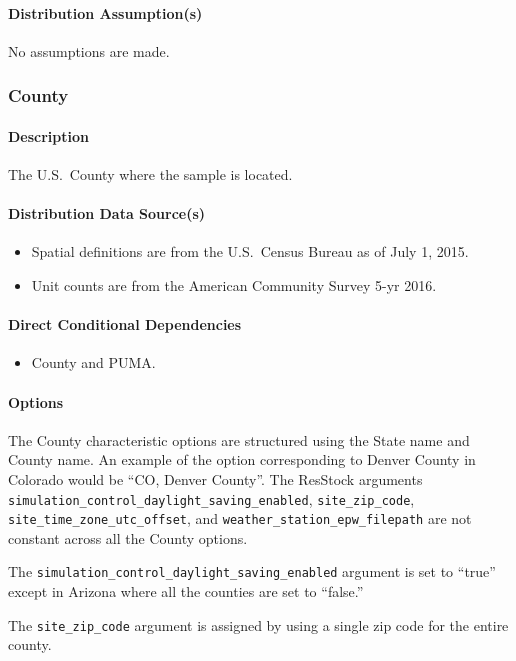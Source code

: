 \paragraph{Distribution Assumption(s)}
No assumptions are made.


\subsubsection{County}
\paragraph{Description}
The U.S.~County where the sample is located.

\paragraph{Distribution Data Source(s)}
\begin{itemize} 
\item
  Spatial definitions are from the U.S.~Census Bureau as of July 1,
  2015.
\item
  Unit counts are from the American Community Survey 5-yr 2016.
\end{itemize}

\paragraph{Direct Conditional Dependencies}
\begin{itemize}
    \item County and PUMA.
\end{itemize}

\paragraph{Options}
The County characteristic options are structured using the State name and County name. An example of the option corresponding to Denver County in Colorado would be ``CO, Denver County''. The ResStock arguments \texttt{simulation\_control\_daylight\_saving\_enabled}, \texttt{site\_zip\_code}, \texttt{site\_time\_zone\_utc\_offset}, and \texttt{weather\_station\_epw\_filepath} are not constant across all the County options. 

The \texttt{simulation\_control\_daylight\_saving\_enabled} argument is set to ``true'' except in Arizona where all the counties are set to ``false.'' 

The \texttt{site\_zip\_code} argument is assigned by using a single zip code for the entire county.

